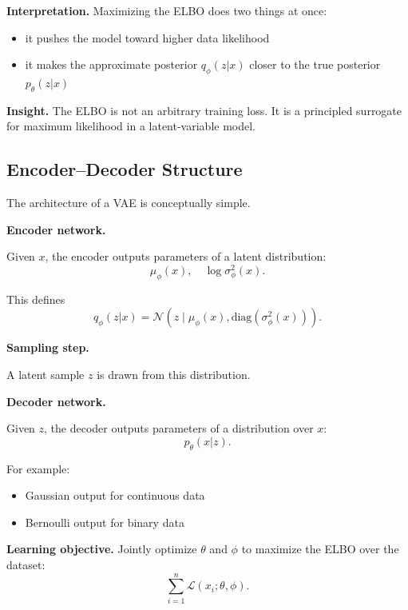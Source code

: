 \medskip

\noindent
\textbf{Interpretation.}  
Maximizing the ELBO does two things at once:

\begin{itemize}
    \item it pushes the model toward higher data likelihood
    \item it makes the approximate posterior $q_\phi(z|x)$ closer to the true posterior $p_\theta(z|x)$
\end{itemize}

\medskip

\noindent
\textbf{Insight.}  
The ELBO is not an arbitrary training loss. It is a principled surrogate for maximum likelihood in a latent-variable model.

\subsection{Encoder--Decoder Structure}

The architecture of a VAE is conceptually simple.

\medskip

\noindent
\textbf{Encoder network.}

Given $x$, the encoder outputs parameters of a latent distribution:
\[
\mu_\phi(x), \quad \log \sigma_\phi^2(x).
\]

This defines
\[
q_\phi(z|x)=\mathcal{N}(z\mid \mu_\phi(x), \mathrm{diag}(\sigma_\phi^2(x))).
\]

\medskip

\noindent
\textbf{Sampling step.}

A latent sample $z$ is drawn from this distribution.

\medskip

\noindent
\textbf{Decoder network.}

Given $z$, the decoder outputs parameters of a distribution over $x$:
\[
p_\theta(x|z).
\]

For example:
\begin{itemize}
    \item Gaussian output for continuous data
    \item Bernoulli output for binary data
\end{itemize}

\medskip

\noindent
\textbf{Learning objective.}  
Jointly optimize $\theta$ and $\phi$ to maximize the ELBO over the dataset:
\[
\sum_{i=1}^n \mathcal{L}(x_i;\theta,\phi).
\]

